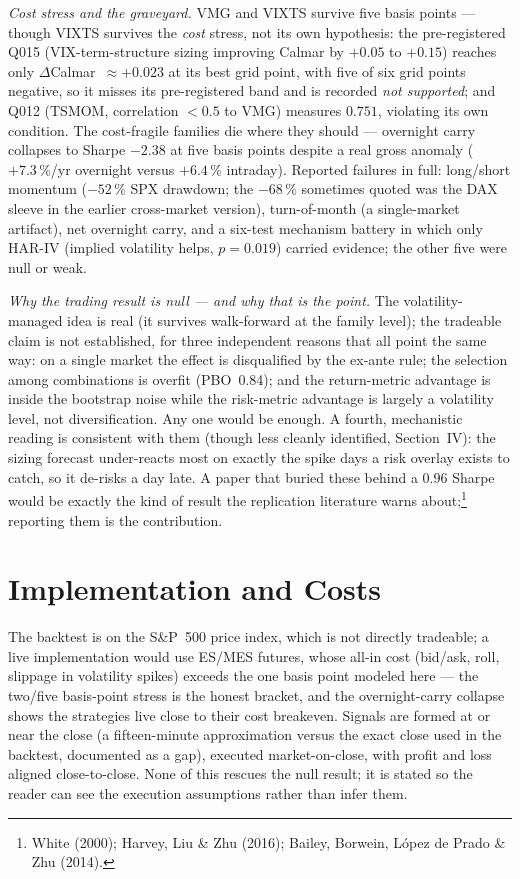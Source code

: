 \documentclass[12pt,a4paper]{article}
\newcommand{\cf}[1]{\footnote{#1}}
\begin{document}
\emph{Cost stress and the graveyard.} VMG and VIXTS survive five basis points --- though VIXTS survives the \emph{cost} stress, not its own hypothesis: the pre-registered Q015 (VIX-term-structure sizing improving Calmar by $+0.05$ to $+0.15$) reaches only $\Delta$Calmar~$\approx+0.023$ at its best grid point, with five of six grid points negative, so it misses its pre-registered band and is recorded \emph{not supported}; and Q012 (TSMOM, correlation $<0.5$ to VMG) measures $0.751$, violating its own condition. The cost-fragile
families die where they should --- overnight carry collapses to Sharpe $-2.38$ at five basis points
despite a real gross anomaly ($+7.3\,\%$/yr overnight versus $+6.4\,\%$ intraday). Reported failures in
full: long/short momentum ($-52\,\%$ SPX drawdown; the $-68\,\%$ sometimes quoted was the DAX sleeve in the earlier cross-market version), turn-of-month (a single-market artifact), net overnight
carry, and a six-test mechanism battery in which only HAR-IV (implied volatility helps, $p=0.019$)
carried evidence; the other five were null or weak.

\emph{Why the trading result is null --- and why that is the point.} The volatility-managed idea is
real (it survives walk-forward at the family level); the tradeable claim is not established, for three
independent reasons that all point the same way: on a single market the effect is disqualified by the
ex-ante rule; the selection among combinations is overfit (PBO~0.84); and the return-metric advantage
is inside the bootstrap noise while the risk-metric advantage is largely a volatility level, not
diversification. Any one would be enough. A fourth, mechanistic reading is consistent with them (though
less cleanly identified, Section~IV): the sizing forecast under-reacts most on exactly the spike days a
risk overlay exists to catch, so it de-risks a day late. A paper that buried these behind a 0.96 Sharpe
would be exactly the kind of result the replication literature warns about;\cf{White (2000); Harvey,
Liu \& Zhu (2016); Bailey, Borwein, L\'opez de Prado \& Zhu (2014).} reporting them is the contribution.

\section{Implementation and Costs}

The backtest is on the S\&P~500 price index, which is not directly tradeable; a live implementation
would use ES/MES futures, whose all-in cost (bid/ask, roll, slippage in volatility spikes) exceeds the
one basis point modeled here --- the two/five basis-point stress is the honest bracket, and the
overnight-carry collapse shows the strategies live close to their cost breakeven. Signals are formed
at or near the close (a fifteen-minute approximation versus the exact close used in the backtest,
documented as a gap), executed market-on-close, with profit and loss aligned close-to-close. None of
this rescues the null result; it is stated so the reader can see the execution assumptions rather than
infer them.
\end{document}
